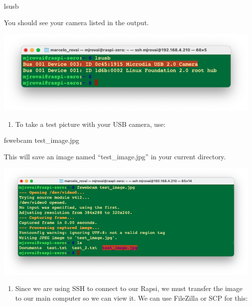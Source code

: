 \documentclass[
]{article}
\newenvironment{Shaded}{\begin{snugshade}}{\end{snugshade}}
\newcommand{\ExtensionTok}[1]{\textcolor[rgb]{0.00,0.23,0.31}{#1}}
\newcommand{\NormalTok}[1]{\textcolor[rgb]{0.00,0.23,0.31}{#1}}
\providecommand{\tightlist}{%
  \setlength{\itemsep}{0pt}\setlength{\parskip}{0pt}}\usepackage{longtable,booktabs,array}
\begin{document}
\begin{Shaded}
\begin{Highlighting}[]
\ExtensionTok{lsusb}
\end{Highlighting}
\end{Shaded}

You should see your camera listed in the output.

\noindent \begin{center}
\includegraphics[width=0.75\linewidth,height=\textheight,keepaspectratio]{images/png/usb-cam-2.png}
\end{center}

\begin{enumerate}
\def\labelenumi{\arabic{enumi}.}
\setcounter{enumi}{4}
\tightlist
\item
  To take a test picture with your USB camera, use:
\end{enumerate}

\begin{Shaded}
\begin{Highlighting}[]
\ExtensionTok{fswebcam}\NormalTok{ test\_image.jpg}
\end{Highlighting}
\end{Shaded}

This will save an image named ``test\_image.jpg'' in your current
directory.

\noindent \begin{center}
\includegraphics[width=0.85\linewidth,height=\textheight,keepaspectratio]{images/png/image-test.png}
\end{center}

\begin{enumerate}
\def\labelenumi{\arabic{enumi}.}
\setcounter{enumi}{5}
\tightlist
\item
  Since we are using SSH to connect to our Rapsi, we must transfer the
  image to our main computer so we can view it. We can use FileZilla or
  SCP for this:
\end{enumerate}
\end{document}
